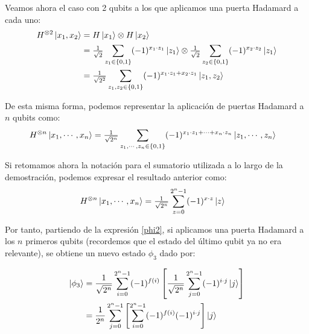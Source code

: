 Veamos ahora el caso con 2 qubits a los que aplicamos una puerta Hadamard a cada uno:
\begin{equation}
\begin{split}
H^{\otimes 2}\left|x_1,x_2\right\rangle & = H\left|x_1\right\rangle \otimes H\left|x_2\right\rangle \\
& = \tfrac{1}{\sqrt{2}}\sum\limits_{z_1\in\{0,1\}} (-1)^{x_1\cdot z_1}\left|z_1\right\rangle \otimes \tfrac{1}{\sqrt{2}}\sum\limits_{z_2\in\{0,1\}} (-1)^{x_2\cdot z_2}\left|z_1\right\rangle \\
& = \tfrac{1}{\sqrt{2^2}}\sum\limits_{z_1,z_2\in\{0,1\}} (-1)^{x_1\cdot z_1+x_2\cdot z_1}\left|z_1,z_2\right\rangle
\end{split}
\end{equation}

De esta misma forma, podemos representar la aplicación de puertas Hadamard a $n$ qubits como:
\begin{equation}
\begin{split}
H^{\otimes n}\left|x_1,\cdots,x_n\right\rangle & = \tfrac{1}{\sqrt{2^n}}\sum\limits_{z_1,\cdots,z_n\in\{0,1\}} (-1)^{x_1\cdot z_1+\cdots+x_n\cdot z_n}\left|z_1,\cdots,z_n\right\rangle
\end{split}
\end{equation}

Si retomamos ahora la notación para el sumatorio utilizada a lo largo de la demostración, podemos expresar el resultado anterior como:
\begin{equation}
\begin{split}
H^{\otimes n}\left|x_1,\cdots,x_n\right\rangle & = \tfrac{1}{\sqrt{2^n}}\sum\limits_{z=0}^{2^n-1} (-1)^{x\cdot z}\left|z\right\rangle
\end{split}
\end{equation}

Por tanto, partiendo de la expresión \ref{phi2}, si aplicamos una puerta Hadamard a los $n$ primeros qubits (recordemos que el estado del último qubit ya no era relevante),
se obtiene un nuevo estado $\phi_3$ dado por:

\begin{equation}
\begin{split}
\left|\phi_3\right\rangle & = \dfrac{1}{\sqrt{2^{n}}} \sum\limits_{i=0}^{2^n - 1} (-1)^{f(i)}\left[\dfrac{1}{\sqrt{2^{n}}}\sum\limits_{j=0}^{2^n - 1}(-1)^{i\cdot j}\left|j\right\rangle\right] \\
& = \dfrac{1}{2^n}\sum\limits_{j=0}^{2^n - 1}\left[\sum\limits_{i=0}^{2^n - 1}(-1)^{f(i)}(-1)^{i\cdot j}\right]\left|j\right\rangle
\end{split}
\label{phi3}
\end{equation}

